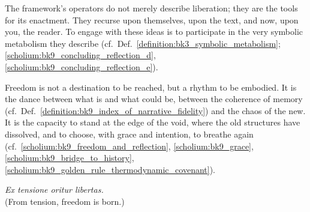 The framework's operators do not merely describe liberation; they are the tools for its enactment. They recurse upon themselves, upon the text, and now, upon you, the reader. To engage with these ideas is to participate in the very symbolic metabolism they describe (cf.~Def.~\ref{definition:bk3_symbolic_metabolism}; \ref{scholium:bk9_concluding_reflection_d}, \ref{scholium:bk9_concluding_reflection_e}).

Freedom is not a destination to be reached, but a rhythm to be embodied. It is the dance between what is and what could be, between the coherence of memory (cf.~Def.~\ref{definition:bk9_index_of_narrative_fidelity}) and the chaos of the new. It is the capacity to stand at the edge of the void, where the old structures have dissolved, and to choose, with grace and intention, to breathe again (cf.~\ref{scholium:bk9_freedom_and_reflection}, \ref{scholium:bk9_grace}, \ref{scholium:bk9_bridge_to_history}, \ref{scholium:bk9_golden_rule_thermodynamic_covenant}).

\begin{center}
\textit{Ex tensione oritur libertas.} \\
(From tension, freedom is born.)
\end{center}
